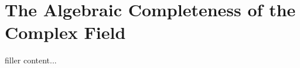 \section{The Algebraic Completeness of the Complex Field}\label{sec:the-algebraic-completeness-of-the-complex-field}

filler content...

